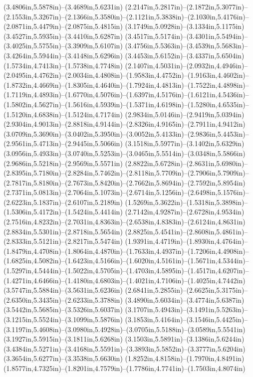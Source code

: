 (3.4806in,5.5878in)--(3.4689in,5.6231in) (2.2147in,5.2817in)--(2.1872in,5.3077in)--(2.1553in,5.3267in)--(2.1366in,5.3580in)--(2.1121in,5.3838in)--(2.1030in,5.4176in)--(2.0871in,5.4479in)--(2.0875in,5.4815in) (3.1749in,5.0928in)--(3.1334in,5.1175in) (3.4527in,5.5935in)--(3.4410in,5.6287in) (3.4517in,5.5174in)--(3.4301in,5.5494in)--(3.4025in,5.5755in)--(3.3909in,5.6107in) (3.4756in,5.5363in)--(3.4539in,5.5683in)--(3.4264in,5.5944in)--(3.4148in,5.6296in) (3.4453in,5.6152in)--(3.4337in,5.6504in) (1.5734in,4.7413in)--(1.5738in,4.7748in) (2.1407in,4.5031in)--(2.0932in,4.4946in)--(2.0495in,4.4762in)--(2.0034in,4.4808in)--(1.9583in,4.4752in)--(1.9163in,4.4602in)--(1.8732in,4.4669in)--(1.8305in,4.4640in)--(1.7924in,4.4813in)--(1.7522in,4.4898in)--(1.7119in,4.4893in)--(1.6770in,4.5076in)--(1.6397in,4.5176in)--(1.6121in,4.5436in)--(1.5802in,4.5627in)--(1.5616in,4.5939in)--(1.5371in,4.6198in)--(1.5280in,4.6535in)--(1.5120in,4.6838in)--(1.5124in,4.7174in) (2.9834in,5.0146in)--(2.9419in,5.0394in) (2.9304in,4.9013in)--(2.8818in,4.9144in)--(2.8326in,4.9165in)--(2.7911in,4.9412in) (3.0709in,5.3690in)--(3.0402in,5.3950in)--(3.0052in,5.4133in)--(2.9836in,5.4453in)--(2.9561in,5.4713in)--(2.9445in,5.5066in) (3.1518in,5.5977in)--(3.1402in,5.6329in) (3.0956in,5.4933in)--(3.0740in,5.5253in)--(3.0465in,5.5514in)--(3.0348in,5.5866in) (2.9686in,5.5218in)--(2.9569in,5.5571in) (2.8822in,5.6728in)--(2.8631in,5.6980in)--(2.8395in,5.7180in)--(2.8284in,5.7462in)--(2.8118in,5.7709in)--(2.7906in,5.7909in)--(2.7817in,5.8180in)--(2.7673in,5.8420in)--(2.7662in,5.8694in)--(2.7592in,5.8954in) (2.7371in,5.0813in)--(2.7064in,5.1073in)--(2.6714in,5.1256in)--(2.6498in,5.1576in)--(2.6223in,5.1837in)--(2.6107in,5.2189in) (1.5269in,5.3622in)--(1.5318in,5.3898in)--(1.5306in,5.4172in)--(1.5424in,5.4414in) (2.7142in,4.9287in)--(2.6728in,4.9534in) (2.7516in,4.8232in)--(2.7031in,4.8363in)--(2.6538in,4.8383in)--(2.6124in,4.8631in) (2.8834in,5.5301in)--(2.8718in,5.5654in) (2.8825in,5.4541in)--(2.8608in,5.4861in)--(2.8333in,5.5121in)--(2.8217in,5.5474in) (1.9391in,4.4719in)--(1.8930in,4.4764in)--(1.8479in,4.4708in)--(1.8064in,4.4870in)--(1.7633in,4.4937in)--(1.7206in,4.4908in)--(1.6825in,4.5082in)--(1.6423in,4.5166in)--(1.6020in,4.5161in)--(1.5671in,4.5344in)--(1.5297in,4.5444in)--(1.5022in,4.5705in)--(1.4703in,4.5895in)--(1.4517in,4.6207in)--(1.4271in,4.6466in)--(1.4180in,4.6803in)--(1.4021in,4.7106in)--(1.4025in,4.7442in) (3.5747in,5.5884in)--(3.5631in,5.6236in) (2.6841in,5.2855in)--(2.6625in,5.3175in)--(2.6350in,5.3435in)--(2.6233in,5.3788in) (3.4890in,5.6034in)--(3.4774in,5.6387in) (3.5442in,5.5685in)--(3.5326in,5.6037in) (3.1707in,5.4943in)--(3.1491in,5.5263in)--(3.1215in,5.5524in)--(3.1099in,5.5876in) (3.1853in,5.4164in)--(3.1546in,5.4425in)--(3.1197in,5.4608in)--(3.0980in,5.4928in)--(3.0705in,5.5188in)--(3.0589in,5.5541in) (3.1927in,5.5915in)--(3.1811in,5.6268in) (3.1503in,5.5891in)--(3.1386in,5.6244in) (3.4384in,5.5271in)--(3.4168in,5.5591in)--(3.3893in,5.5852in)--(3.3777in,5.6204in) (3.3654in,5.6277in)--(3.3538in,5.6630in) (1.8252in,4.8158in)--(1.7970in,4.8491in) (1.8577in,4.7325in)--(1.8201in,4.7579in)--(1.7786in,4.7741in)--(1.7503in,4.8074in) 